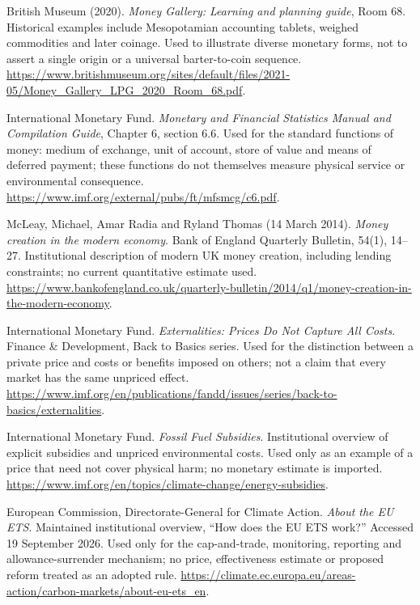  British Museum (2020). \textit{Money Gallery:
Learning and planning guide}, Room 68. Historical examples include
Mesopotamian accounting tablets, weighed commodities and later coinage.
Used to illustrate diverse monetary forms, not to assert a single origin
or a universal barter-to-coin sequence.
\url{https://www.britishmuseum.org/sites/default/files/2021-05/Money_Gallery_LPG_2020_Room_68.pdf}.

 International Monetary Fund.
\textit{Monetary and Financial Statistics Manual and Compilation Guide},
Chapter 6, section 6.6. Used for the standard functions of money:
medium of exchange, unit of account, store of value and means of
deferred payment; these functions do not themselves measure physical
service or environmental consequence.
\url{https://www.imf.org/external/pubs/ft/mfsmcg/c6.pdf}.

 McLeay, Michael, Amar Radia and Ryland Thomas (14 March 2014).
\textit{Money creation in the modern economy}. Bank of England Quarterly
Bulletin, 54(1), 14--27. Institutional description of modern UK money creation,
including lending constraints; no current quantitative estimate used.
\url{https://www.bankofengland.co.uk/quarterly-bulletin/2014/q1/money-creation-in-the-modern-economy}.

 International Monetary Fund.
\textit{Externalities: Prices Do Not Capture All Costs}. Finance \& Development,
Back to Basics series. Used for the distinction between a private price and
costs or benefits imposed on others; not a claim that every market has the
same unpriced effect.
\url{https://www.imf.org/en/publications/fandd/issues/series/back-to-basics/externalities}.

 International Monetary Fund.
\textit{Fossil Fuel Subsidies}. Institutional overview of explicit subsidies
and unpriced environmental costs. Used only as an example of a price that
need not cover physical harm; no monetary estimate is imported.
\url{https://www.imf.org/en/topics/climate-change/energy-subsidies}.

 European Commission, Directorate-General for Climate Action.
\textit{About the EU ETS}. Maintained institutional overview, ``How does the
EU ETS work?'' Accessed 19 September 2026. Used only for the cap-and-trade,
monitoring, reporting and allowance-surrender mechanism; no price, effectiveness
estimate or proposed reform treated as an adopted rule.
\url{https://climate.ec.europa.eu/areas-action/carbon-markets/about-eu-ets_en}.

